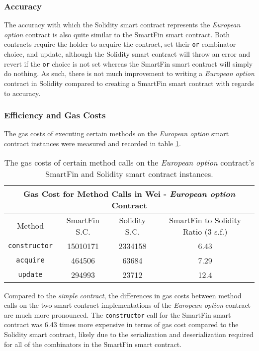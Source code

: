 \subsubsection{Accuracy}

The accuracy with which the Solidity smart contract represents the \textit{European option} contract is also quite similar to the SmartFin smart contract. Both contracts require the holder to acquire the contract, set their \texttt{or} combinator choice, and update, although the Solidity smart contract will throw an error and revert if the \texttt{or} choice is not set whereas the SmartFin smart contract will simply do nothing. As such, there is not much improvement to writing a \textit{European option} contract in Solidity compared to creating a SmartFin smart contract with regards to accuracy.


\subsubsection{Efficiency and Gas Costs}

The gas costs of executing certain methods on the \textit{European option} smart contract instances were measured and recorded in table \ref{table:gas-cost-euro-option}. \\

\begin{table}[h!]
    \centering
    \begin{tabular}{ |c|c|c|c| } 
        \hline
        \multicolumn{4}{|c|}{Gas Cost for Method Calls in Wei - \textit{European option} Contract} \\
        \hline
        Method & SmartFin S.C. & Solidity S.C. & SmartFin to Solidity Ratio (3 s.f.) \\
        \hline
        \texttt{constructor} & 15010171 & 2334158 & 6.43 \\ 
        \hline
        \texttt{acquire} & 464506 & 63684 & 7.29 \\ 
        \hline
        \texttt{update} & 294993 & 23712 & 12.4 \\ 
        \hline
    \end{tabular}
    \caption{The gas costs of certain method calls on the \textit{European option} contract's SmartFin and Solidity smart contract instances.}
    \label{table:gas-cost-euro-option}
\end{table}

Compared to the \textit{simple contract}, the differences in gas costs between method calls on the two smart contract implementations of the \textit{European option} contract are much more pronounced. The \texttt{constructor} call for the SmartFin smart contract was 6.43 times more expensive in terms of gas cost compared to the Solidity smart contract, likely due to the serialization and deserialization required for all of the combinators in the SmartFin smart contract. \\

